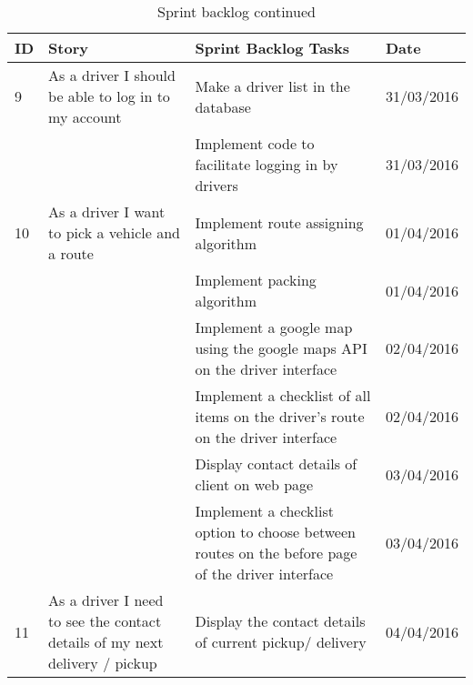 \documentclass[paper=a4, fontsize=11pt]{scrartcl} %
\numberwithin{equation}{section} %
\numberwithin{figure}{section} %
\numberwithin{table}{section} %
\begin{document}
\begin{table}[!hbt]
\centering
\caption{Sprint backlog continued}

\begin{tabular}{|p{1cm}|p{5cm}|p{5cm}|p{2cm}|}
\hline
\textbf{ID} & \textbf{Story}                                                             & \textbf{Sprint Backlog Tasks}                                                                    & \textbf{Date} \\ \hline
9           & As a driver I should be able to log in to my account                       & Make a driver list in the database                                                               & 31/03/2016    \\ \hline
            &                                                                            & Implement code to facilitate logging in by drivers                                               & 31/03/2016    \\ \hline
10          & As a driver I want to pick a vehicle and a route                           & Implement route assigning algorithm                                                              & 01/04/2016    \\ \hline
            &                                                                            & Implement packing algorithm                                                                      & 01/04/2016    \\ \hline
            &                                                                            & Implement a google map using the google maps API on the driver interface                         & 02/04/2016    \\ \hline
            &                                                                            & Implement a checklist of all items on  the driver's route on the driver interface                & 02/04/2016    \\ \hline
            &                                                                            & Display contact details of client on web page                                                    & 03/04/2016    \\ \hline
            &                                                                            & Implement a checklist option to choose between routes on the before page of the driver interface & 03/04/2016    \\ \hline
11          & As a driver I need to see the contact details of my next delivery / pickup & Display the contact details of current pickup/ delivery                                          & 04/04/2016    \\ \hline

\end{tabular}
\end{table}
\end{document}
